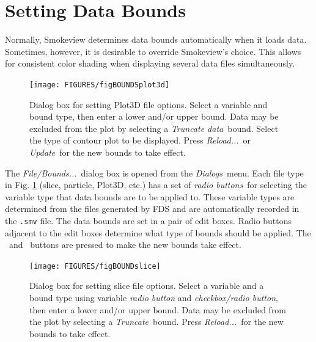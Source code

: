 \documentclass[11pt,twoside]{book}
\newcommand{\frameit}[1]{\fbox{\tt #1}}
\begin{document}
\section{Setting Data Bounds}

Normally, Smokeview determines data bounds automatically when it
loads data. Sometimes, however, it is desirable to override
Smokeview's choice.  This allows for consistent color shading when
displaying several data files simultaneously.

\begin{figure}[\figoptions]
\centerline{
\texttt{[image: FIGURES/figBOUNDSplot3d]}
} \caption[Dialog box for setting Plot3D file
options.] {Dialog box for setting Plot3D file
options. Select a variable and bound type, then enter a lower
and/or upper bound. Data may be excluded from the plot by
selecting a {\em Truncate data}\ bound. Select the type of contour
plot to be displayed. Press {\em Reload...}\ or {\em Update}\ for
the new bounds to take effect.} \label{figBOUNDSplot3d}
\end{figure}

The {\em File/Bounds...}\ dialog box is opened from the {\em
Dialogs}\ menu. Each file type in Fig. \ref{figBOUNDSplot3d}
(slice, particle, Plot3D, etc.) has a set of {\em radio buttons}\
for selecting the variable type that data bounds are to be applied
to. These variable types are determined from the files generated
by FDS and are automatically recorded in the {\tt .smv} file. The
data bounds are set in a pair of edit boxes. Radio buttons
adjacent to the edit boxes determine what type of bounds should be
applied.  The \frameit{Update}\ and \frameit{Reload}\ buttons are
pressed to make the new bounds take effect.

\begin{figure}[\figoptions]
\centerline{\texttt{[image: FIGURES/figBOUNDslice]}
} \caption[Dialog box for setting slice file
options.]
{Dialog box for setting slice file
options.
Select a variable and a bound
type using variable {\em radio button} and {\em checkbox/radio button}, then enter a lower and/or upper
bound. Data may be excluded from the plot by
selecting a {\em Truncate}\ bound.
 Press {\em Reload...}\ for the new bounds to take
effect.} \label{figBOUNDSslice}
\end{figure}
\end{document}
